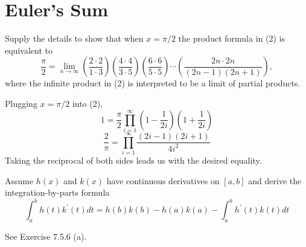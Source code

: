 \section{Euler's Sum}
\begin{exercise}
Supply the details to show that when \(x = \pi/2\) the product formula in (2) is equivalent to
\[\frac{\pi}{2} = \lim_{n \to \infty} \left(\frac{2 \cdot 2}{1 \cdot 3}\right) \left(\frac{4 \cdot 4}{3 \cdot 5}\right) \left(\frac{6 \cdot 6}{5 \cdot 5}\right) \cdots \left(\frac{2n \cdot 2n}{(2n-1)(2n+1)}\right),\]
where the infinite product in (2) is interpreted to be a limit of partial products.
\end{exercise}
\begin{solution}
Plugging \(x = \pi/2\) into (2),
\[
1 = \frac{\pi}{2} \prod^\infty_{i=1} \left(1 - \frac{1}{2i}\right)\left(1 + \frac{1}{2i}\right)\]
\[
\frac{2}{\pi} = \prod^\infty_{i=1} \frac{(2i-1)(2i + 1)}{4i^2}
\]
Taking the reciprocal of both sides leads us with the desired equality.
\end{solution}

\begin{exercise}
Assume $h(x)$ and $k(x)$ have continuous derivatives on $[a, b]$ and derive the integration-by-parts formula
$$
\int_{a}^{b} h(t) k^{\prime}(t) dt=h(b) k(b)-h(a) k(a)-\int_{a}^{b} h^{\prime}(t) k(t) dt
$$
\end{exercise}
\begin{solution}
See Exercise 7.5.6 (a).
\end{solution}


